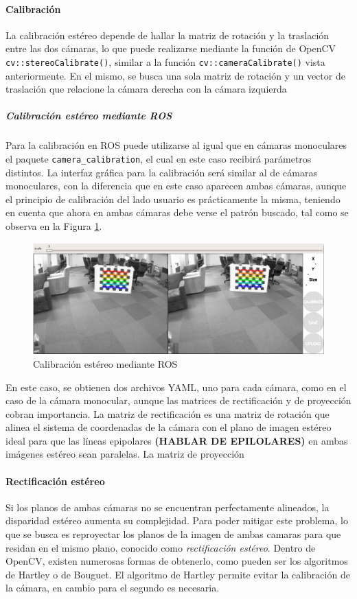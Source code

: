 \paragraph{Calibración}
La calibración estéreo depende de hallar la matriz de rotación y la traslación entre las dos cámaras, lo que puede realizarse mediante la función de OpenCV \texttt{cv::stereoCalibrate()}, similar a la función \texttt{cv::cameraCalibrate()} vista anteriormente. En el mismo, se busca una sola matriz de rotación y un vector de traslación que relacione la cámara derecha con la cámara izquierda
\subparagraph{Calibración estéreo mediante ROS}
Para la calibración en ROS puede utilizarse al igual que en cámaras monoculares el paquete \texttt{camera\_calibration}, el cual en este caso recibirá parámetros distintos. La interfaz gráfica para la calibración será similar al de cámaras monoculares, con la diferencia que en este caso aparecen ambas cámaras, aunque el principio de calibración del lado usuario es prácticamente la misma, teniendo en cuenta que ahora en ambas cámaras debe verse el patrón buscado, tal como se observa en la Figura \ref{fig:stereocalibrationchessboard}.
\begin{figure}
    \centering
    \includegraphics[width=\textwidth]{Img/StereoCalibrationChessboard.png}
    \caption{Calibración estéreo mediante ROS}
    \label{fig:stereocalibrationchessboard}
\end{figure}

En este caso, se obtienen dos archivos YAML, uno para cada cámara, como en el caso de la cámara monocular, aunque las matrices de rectificación y de proyección cobran importancia. La matriz de rectificación es una matriz de rotación que alinea el sistema de coordenadas de la cámara con el plano de imagen estéreo ideal para que las líneas epipolares \textbf{(HABLAR DE EPILOLARES)} en ambas imágenes estéreo sean paralelas. La matriz de proyección

\paragraph{Rectificación estéreo}
Si los planos de ambas cámaras no se encuentran perfectamente alineados, la disparidad estéreo aumenta su complejidad. Para poder mitigar este problema, lo que se busca es reproyectar los planos de la imagen de ambas camaras para que residan en el mismo plano, conocido como \textit{rectificación estéreo}. Dentro de OpenCV, existen numerosas formas de obtenerlo, como pueden ser los algoritmos de Hartley o de Bouguet. El algoritmo de Hartley permite evitar la calibración de la cámara, en cambio para el segundo es necesaria.

